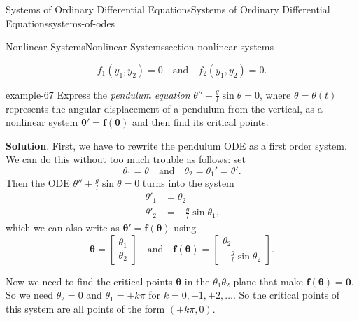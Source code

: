 \documentclass[oneside,10pt,]{book}
\numberwithin{equation}{section}
\renewcommand{\vec}[1]{\mathbf{#1}}
\newcommand{\vecm}[1]{\bm{#1}}
\newcommand{\vecm}[1]{\boldsymbol{#1}}
\newcommand{\amp}{&}
\begin{document}
\begin{chapterptx}{Systems of Ordinary Differential Equations}{}{Systems of Ordinary Differential Equations}{}{}{systems-of-odes}
\begin{sectionptx}{Nonlinear Systems}{}{Nonlinear Systems}{}{}{section-nonlinear-systems}
\begin{introduction}{}
\begin{equation*}
f_{1}(y_{1},y_{2}) = 0\quad\text{and}\quad f_{2}(y_{1},y_{2}) = 0.  
\end{equation*}
%
\begin{example}{}{example-67}%
\hypertarget{p-403}{}%
Express the \emph{pendulum equation} \(\theta''+\frac{g}{l}\sin\theta=0\), where \(\theta=\theta(t)\) represents the angular displacement of a pendulum from the vertical, as a nonlinear system \(\vecm{\theta}' = \vec{f}(\vecm{\theta})\) and then find its critical points.%
\par\smallskip%
\noindent\textbf{Solution}.\hypertarget{solution-64}{}\quad%
\hypertarget{p-404}{}%
First, we have to rewrite the pendulum ODE as a first order system. We can do this without too much trouble as follows: set%
\begin{equation*}
\theta_{1} = \theta\quad\text{and}\quad\theta_{2} = \theta_{1}' = \theta'\text{.}
\end{equation*}
Then the ODE \(\theta''+\frac{g}{l}\sin\theta = 0\) turns into the system%
\begin{align*}
\theta'_{1} \amp = \theta_{2}\\
\theta'_{2} \amp = -\frac{g}{l}\sin\theta_{1}\text{,}
\end{align*}
which we can also write as \(\boldsymbol{\theta}' = \vec{f}(\boldsymbol{\theta})\) using%
\begin{equation*}
\vecm{\theta} = \begin{bmatrix}\theta_{1} \\ \theta_{2}\end{bmatrix}\quad\text{and}\quad \vec{f}(\vecm{\theta}) = \begin{bmatrix}\theta_{2} \\ -\frac{g}{l}\sin\theta_{2}\end{bmatrix}.
\end{equation*}
%
\par
\hypertarget{p-405}{}%
Now we need to find the critical points \(\vecm{\theta}\) in the \(\theta_{1}\theta_{2}\)-plane that make \(\vec{f}(\vecm{\theta}) = \vec{0}\). So we need \(\theta_{2} = 0\) and \(\theta_{1} = \pm k\pi\) for \(k=0,\pm1,\pm2,\dots\). So the critical points of this system are all points of the form \((\pm k\pi,0)\).%
\end{example}
\end{introduction}%
%
%
\typeout{************************************************}
\typeout{************************************************}

\end{sectionptx}
\end{chapterptx}
\end{document}
